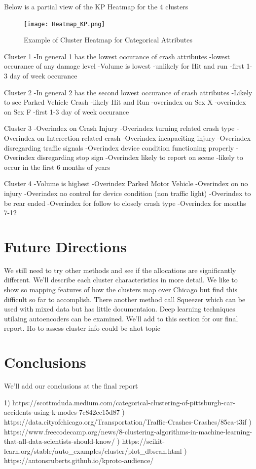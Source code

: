\documentclass[conference]{IEEEtran}
\begin{document}
Below is a partial view of the KP Heatmap for the 4 clusters

\begin{figure}[!h]
	\texttt{[image: Heatmap\_KP.png]}
	\caption{Example of Cluster Heatmap for Categorical Attributes }
	\label{fig: Cluster Heatmap for Categorical Attributes (4 Clusters)}
\end{figure}

Cluster 1
-In general 1 has the lowest occurance of crash attributes
-lowest occurance of any damage level
-Volume is lowest
-unlikely for Hit and run
-first 1-3 day of week occurance

Cluster 2
-In general 2 has the second lowest occurance of crash attributes
-Likely to see Parked Vehicle Crash
-likely Hit and Run
-overindex on Sex X
-overindex on Sex F
-first 1-3 day of week occurance

Cluster 3
-Overindex on Crash Injury
-Overindex turning related crash type
-Overindex on Interection related crash
-Overindex incapaciting injury
-Overindex disregarding traffic signals
-Overindex device condition functioning properly
-Overindex disregarding stop sign
-Overindex likely to report on scene
-likely to occur in the first 6 months of years

Cluster 4
-Volume is highest
-Overindex Parked Motor Vehicle
-Overindex on no injury
-Overindex no control for device condition (non traffic light)
-Overindex to be rear ended
-Overindex for follow to closely crash type
-Overindex for months 7-12



\section{Future Directions}
We still need to try other methods and see if the allocations are significantly different.  We'll describe each cluster characteristics in more detail.
We like to show so mapping features of how the clusters map over Chicago but find this difficult so far to accomplish.  There another method call Squeezer which can be used with mixed data but has little documentaion.  Deep learning techniques utilaing autoencoders can be examined.  We'll add to this section for our final report.  Ho to assess cluster info could be ahot topic

\section{Conclusions}
We'll add our conclusions at the final report
 



1) https://scottmduda.medium.com/categorical-clustering-of-pittsburgh-car-accidents-using-k-modes-7c842cc15d87 ) https://data.cityofchicago.org/Transportation/Traffic-Crashes-Crashes/85ca-t3if ) https://www.freecodecamp.org/news/8-clustering-algorithms-in-machine-learning-that-all-data-scientists-should-know/  ) https://scikit-learn.org/stable/auto_examples/cluster/plot_dbscan.html ) https://antonsruberts.github.io/kproto-audience/ \linebreak
\end{document}
